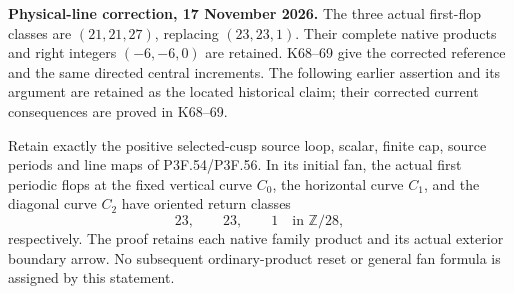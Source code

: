 \begin{theorem}\label{night:P3K.54}
\par\noindent\textbf{Physical-line correction, 17 November 2026.} The three actual first-flop classes are \((21,21,27)\), replacing \((23,23,1)\). Their complete native products and right integers \((-6,-6,0)\) are retained. K68--69 give the corrected reference and the same directed central increments. The following earlier assertion and its argument are retained as the located historical claim; their corrected current consequences are proved in K68--69.\medskip\par 
Retain exactly the positive selected-cusp source loop, scalar, finite cap,
source periods and line maps of P3F.54/P3F.56. In its initial fan,
the actual first periodic flops at the fixed vertical curve \(C_0\),
the horizontal curve \(C_1\), and the diagonal curve \(C_2\) have
oriented return classes
\[
 23,\qquad23,\qquad1\quad\text{in }\mathbb Z/28,
\]
respectively. The proof retains each native family product and its
actual exterior boundary arrow. No subsequent ordinary-product
reset or general fan formula is assigned by this statement.
\end{theorem}
